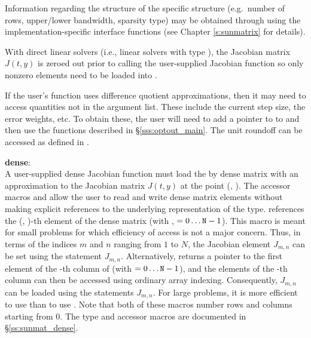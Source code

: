 {
  Information regarding the structure of the specific {\sunmatrix}
  structure (e.g.~number of rows, upper/lower bandwidth, sparsity
  type) may be obtained through using the implementation-specific
  {\sunmatrix} interface functions (see Chapter \ref{s:sunmatrix} for
  details).

  With direct linear solvers (i.e., linear solvers with type
  ), the Jacobian matrix $J(t,y)$ is zeroed out
  prior to calling the user-supplied Jacobian function so only nonzero elements
  need to be loaded into .

  If the user's  function uses difference quotient
  approximations, then it may need to access quantities not in the
  argument list.  These include the current step size, the error
  weights, etc.  To obtain these, the user will need to add a pointer
  to  to  and then use the 
  functions described in \S\ref{sss:optout_main}. The unit roundoff
  can be accessed as  defined in
  .

  {\bf dense}:\\
  A user-supplied dense Jacobian function must load the  by 
  dense matrix  with an approximation to the Jacobian matrix $J(t,y)$
  at the point (, ).  The accessor macros 
  and  allow the user to read and write dense matrix
  elements without making explicit references to the underlying
  representation of the {\sunmatdense} type.
   references the (, )-th
  element of the dense matrix  (with , $= 0\ldots
  {\tt N}-1$). This macro is meant for small problems for which efficiency
  of access is not a major concern.  Thus, in terms of the indices $m$
  and $n$ ranging from $1$ to $N$, the Jacobian element $J_{m,n}$ can
  be set using the statement 
  $J_{m,n}$.  Alternatively,  returns a
  pointer to the first element of the -th column of 
  (with $= 0\ldots {\tt N}-1$), and the elements of the -th column
  can then be accessed using ordinary array indexing.  Consequently,
  $J_{m,n}$ can be loaded using the statements
    $J_{m,n}$.
  For large problems, it is more efficient to use 
  than to use .  Note that both of these macros
  number rows and columns starting from $0$.  The {\sunmatdense} type
  and accessor macros are documented in \S\ref{ss:sunmat_dense}.

}
